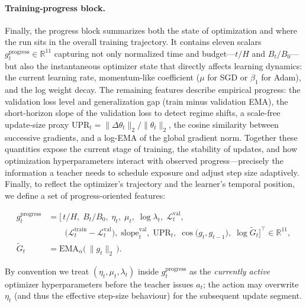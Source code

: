 \documentclass[11pt]{article}
\newcommand{\R}{\mathbb{R}}
\newcommand{\1}{\mathbf{1}}
\begin{document}
\paragraph{Training-progress block.}
Finally, the progress block summarizes both the state of optimization and where the run sits in the overall training trajectory. It contains eleven scalars
\(
g^{\text{progress}}_t\in\R^{11}
\)
capturing not only normalized time and budget---$t/H$ and $B_t/B_0$---but also the instantaneous optimizer state that directly affects learning dynamics: the current learning rate, momentum-like coefficient ($\mu$ for SGD or $\beta_1$ for Adam), and the log weight decay. The remaining features describe empirical progress: the validation loss level and generalization gap (train minus validation EMA), the short-horizon slope of the validation loss to detect regime shifts, a scale-free update-size proxy $\mathrm{UPR}_t=\|\Delta\theta_t\|_2/\|\theta_t\|_2$, the cosine similarity between successive gradients, and a log-EMA of the global gradient norm. Together these quantities expose the current stage of training, the stability of updates, and how optimization hyperparameters interact with observed progress—precisely the information a teacher needs to schedule exposure and adjust step size adaptively. Finally, to reflect the optimizer’s trajectory and the learner’s temporal position, we define a set of progress-oriented features:

\begin{equation}
\label{eq:gprogress-full}
\begin{aligned}
g^{\text{progress}}_t
&= \Big[\,
t/H,\;
B_t/B_0,\;
\eta_t,\;
\mu_t,\;
\log\lambda_t,\;
\mathcal L^{\mathrm{val}}_t,\\[-0.25em]
&\qquad
\big(\mathcal L^{\mathrm{train}}_t-\mathcal L^{\mathrm{val}}_t\big),\;
\mathrm{slope}^{\mathrm{val}}_t,\;
\mathrm{UPR}_t,\;
\cos\!\big(g_t,g_{t-1}\big),\;
\log \widetilde{G}_t
\Big]^{\!\top}\!\in\mathbb{R}^{11},\\[0.25em]
\widetilde{G}_t
&= \mathrm{EMA}_\alpha\!\big(\,\|g_t\|_2\,\big).
\end{aligned}
\end{equation}

By convention we treat $(\eta_t,\mu_t,\lambda_t)$ inside $g^{\text{progress}}_t$ as the \emph{currently active} optimizer hyperparameters before the teacher issues $a_t$; the action may overwrite $\eta_t$ (and thus the effective step-size behaviour) for the subsequent update segment.
\end{document}
